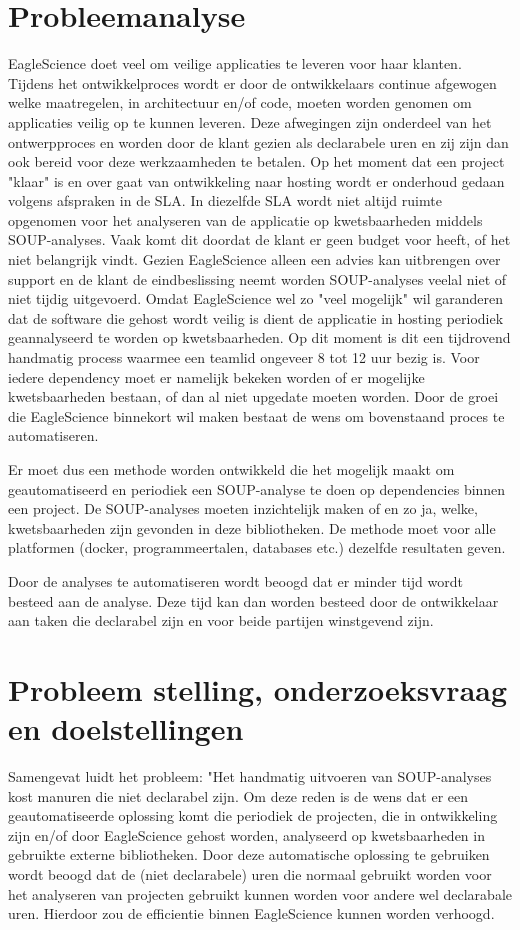 \section{Probleemanalyse}\label{sec:probleemanalyse}
EagleScience doet veel om veilige applicaties te leveren voor haar klanten. Tijdens het ontwikkelproces wordt er door de ontwikkelaars continue afgewogen welke maatregelen, in architectuur en/of code, moeten worden genomen om applicaties veilig op te kunnen leveren. Deze afwegingen zijn onderdeel van het ontwerpproces en worden door de klant gezien als declarabele uren en zij zijn dan ook bereid voor deze werkzaamheden te betalen. Op het moment dat een project "klaar" is en over gaat van ontwikkeling naar hosting wordt er onderhoud gedaan volgens afspraken in de SLA. In diezelfde SLA wordt niet altijd ruimte opgenomen voor het analyseren van de applicatie op kwetsbaarheden middels SOUP-analyses. Vaak komt dit doordat de klant er geen budget voor heeft, of het niet belangrijk vindt. Gezien EagleScience alleen een advies kan uitbrengen over support en de klant de eindbeslissing neemt worden SOUP-analyses veelal niet of niet tijdig uitgevoerd. Omdat EagleScience wel zo "veel mogelijk" wil garanderen dat de software die gehost wordt veilig is dient de applicatie in hosting periodiek geannalyseerd te worden op kwetsbaarheden. Op dit moment is dit een tijdrovend handmatig process waarmee een teamlid ongeveer 8 tot 12 uur bezig is. Voor iedere dependency moet er namelijk bekeken worden of er mogelijke kwetsbaarheden bestaan, of dan al niet upgedate moeten worden. Door de groei die EagleScience binnekort wil maken bestaat de wens om bovenstaand proces te automatiseren.

Er moet dus een methode worden ontwikkeld die het mogelijk maakt om geautomatiseerd en periodiek een SOUP-analyse te doen op dependencies binnen een project. De SOUP-analyses moeten inzichtelijk maken of en zo ja, welke, kwetsbaarheden zijn gevonden in deze bibliotheken. De methode moet voor alle platformen (docker, programmeertalen, databases etc.) dezelfde resultaten geven.

Door de analyses te automatiseren wordt beoogd dat er minder tijd wordt besteed aan de analyse. Deze tijd kan dan worden besteed door de ontwikkelaar aan taken die declarabel zijn en voor beide partijen winstgevend zijn.


\section{Probleem stelling, onderzoeksvraag en doelstellingen}\label{sec:probleem-stelling-onderzoeksvraag-en-doelstellingen}
Samengevat luidt het probleem: "Het handmatig uitvoeren van SOUP-analyses kost manuren die niet declarabel zijn. Om deze reden is de wens dat er een geautomatiseerde oplossing komt die periodiek de projecten, die in ontwikkeling zijn en/of door EagleScience gehost worden, analyseerd op kwetsbaarheden in gebruikte externe bibliotheken. Door deze automatische oplossing te gebruiken wordt beoogd dat de (niet declarabele) uren die normaal gebruikt worden voor het analyseren van projecten gebruikt kunnen worden voor andere wel declarabale uren. Hierdoor zou de efficientie binnen EagleScience kunnen worden verhoogd.

